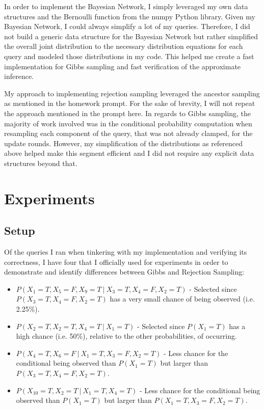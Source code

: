 \documentclass{article} %
\begin{document}
In order to implement the Bayesian Network, I simply leveraged my own data structures and the Bernoulli function from the numpy Python library. Given my Bayesian Network, I could always simplify a lot of my queries. Therefore, I did not build a generic data structure for the Bayesian Network but rather simplified the overall joint distribution to the necessary distribution equations for each query and modeled those distributions in my code. This helped me create a fast implementation for Gibbs sampling and fast verification of the approximate inference.

My approach to implementing rejection sampling leveraged the ancestor sampling as mentioned in the homework prompt. For the sake of brevity, I will not repeat the approach mentioned in the prompt here. In regards to Gibbs sampling, the majority of work involved was in the conditional probability computation when resampling each component of the query, that was not already clamped, for the update rounds. However, my simplification of the distributions as referenced above helped make this segment efficient and I did not require any explicit data structures beyond that.

\section{Experiments}

\subsection{Setup}

Of the queries I ran when tinkering with my implementation and verifying its correctness, I have four that I officially used for experiments in order to demonstrate and identify differences between Gibbs and Rejection Sampling:

\begin{itemize}
\item \(P(X_1=T,X_5=F,X_9=T\ |\ X_3=T,X_4=F,X_2=T)\) - Selected since \(P(X_3=T,X_4=F,X_2=T)\) has a very small chance of being observed (i.e. 2.25\%).
\item \(P(X_2=T,X_2=T,X_4=T\ |\ X_1=T)\) - Selected since \(P(X_1=T)\) has a high chance (i.e. 50\%), relative to the other probabilities, of occurring.
\item \(P(X_4=T,X_6=F\ |\ X_1=T,X_3=F,X_2=T)\) - Less chance for the conditional being observed than \(P(X_1=T)\) but larger than \(P(X_3=T,X_4=F,X_2=T)\).
\item \(P(X_{10}=T,X_2=T\ |\ X_1=T,X_4=T)\) - Less chance for the conditional being observed than \(P(X_1=T)\) but larger than \(P(X_1=T,X_3=F,X_2=T)\).
\end{itemize}
\end{document}
